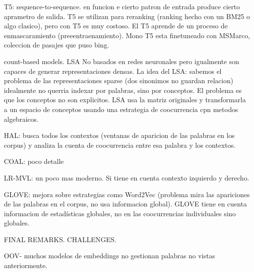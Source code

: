 T5: sequence-to-sequence. en funcion e cierto patron de entrada produce cierto aprametro de salida. T5 se utilizan para reranking (ranking hecho con un BM25 o algo clasico), pero con T5 es muy costoso. El T5 aprende de un proceso de enmascaramiento (preeentraenamiento). Mono T5 esta finetuneado con MSMarco, coleccion de pasajes que puso bing. 

count-based models. LSA
No basados en redes neuronales pero igualmente son capaces de generar representaciones densas. La idea del LSA: sabemos el problema de las representaciones sparse (dos sinonimos no guardan relacion) idealmente no querria indexar por palabras, sino por conceptos. El problema es que los conceptos no son explicitos. LSA usa la matriz originales y transformarla a un espacio de conceptos usando una estrategia de coocurrencia cpn metodos algebraicos. 

HAL:  busca todos los contextos (ventanas de aparicion de las palabras en los corpus) y analiza la cuenta de coocurrencia entre esa palabra y los contextos. 

COAL: poco detalle

LR-MVL: un poco mas moderno. Si tiene en cuenta contexto izquierdo y derecho. 

GLOVE: mejora sobre estrategias como Word2Vec (problema mira las apariciones de las palabras en el corpus, no usa informacion global). GLOVE tiene en cuenta informacion de estadísticas globales, no en las coocurrencias individuales sino globales.

FINAL REMARKS. CHALLENGES.

OOV- muchos modelos de embeddings no gestionan palabras no vistas anteriormente. 